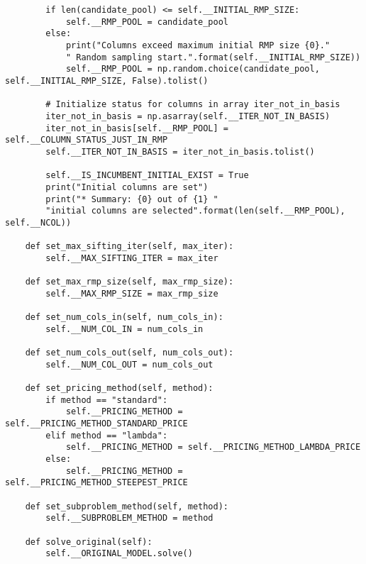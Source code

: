 \documentclass{article}
\begin{document}
\begin{lstlisting}
        if len(candidate_pool) <= self.__INITIAL_RMP_SIZE:
            self.__RMP_POOL = candidate_pool
        else:
            print("Columns exceed maximum initial RMP size {0}."
            " Random sampling start.".format(self.__INITIAL_RMP_SIZE))
            self.__RMP_POOL = np.random.choice(candidate_pool, self.__INITIAL_RMP_SIZE, False).tolist()

        # Initialize status for columns in array iter_not_in_basis
        iter_not_in_basis = np.asarray(self.__ITER_NOT_IN_BASIS)
        iter_not_in_basis[self.__RMP_POOL] = self.__COLUMN_STATUS_JUST_IN_RMP
        self.__ITER_NOT_IN_BASIS = iter_not_in_basis.tolist()

        self.__IS_INCUMBENT_INITIAL_EXIST = True
        print("Initial columns are set")
        print("* Summary: {0} out of {1} "
        "initial columns are selected".format(len(self.__RMP_POOL), self.__NCOL))

    def set_max_sifting_iter(self, max_iter):
        self.__MAX_SIFTING_ITER = max_iter

    def set_max_rmp_size(self, max_rmp_size):
        self.__MAX_RMP_SIZE = max_rmp_size

    def set_num_cols_in(self, num_cols_in):
        self.__NUM_COL_IN = num_cols_in

    def set_num_cols_out(self, num_cols_out):
        self.__NUM_COL_OUT = num_cols_out

    def set_pricing_method(self, method):
        if method == "standard":
            self.__PRICING_METHOD = self.__PRICING_METHOD_STANDARD_PRICE
        elif method == "lambda":
            self.__PRICING_METHOD = self.__PRICING_METHOD_LAMBDA_PRICE
        else:
            self.__PRICING_METHOD = self.__PRICING_METHOD_STEEPEST_PRICE

    def set_subproblem_method(self, method):
        self.__SUBPROBLEM_METHOD = method

    def solve_original(self):
        self.__ORIGINAL_MODEL.solve()

\end{lstlisting}
\end{document}

